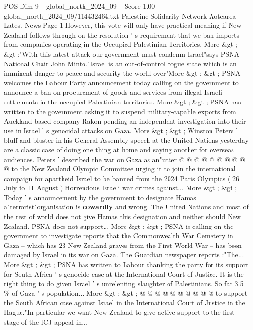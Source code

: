 \begin{textsample}{POS Dim 9 – global\_north\_2024\_09 – Score 1.00 – global\_north\_2024\_09/114432464.txt}  \label{ex:f9_pos_250}
Palestine Solidarity Network Aotearoa - Latest News Page 1 However, this vote will only have practical meaning if New Zealand follows through on the resolution ' s requirement that we ban imports from companies operating in the Occupied Palestinian Territories.
More \&gt ; \&gt ;"With this latest attack our government must condemn Israel"says PSNA National Chair John Minto."Israel is an out-of-control rogue state which is an imminent danger to peace and security the world over"More \&gt ; \&gt ; PSNA welcomes the Labour Party announcement today calling on the government to announce a ban on procurement of goods and services from illegal Israeli settlements in the occupied Palestinian territories.
More \&gt ; \&gt ; PSNA has written to the government asking it to suspend military-capable exports from Auckland-based company Rakon pending an independent investigation into their use in Israel ' s genocidal attacks on Gaza.
More \&gt ; \&gt ; Winston Peters ' bluff and bluster in his General Assembly speech at the United Nations yesterday are a classic case of doing one thing at home and saying another for overseas audiences.
Peters ' described the war on Gaza as an"utter @ @ @ @ @ @ @ @ @ @ to the New Zealand Olympic Committee urging it to join the international campaign for apartheid Israel to be banned from the 2024 Paris Olympics ( 26 July to 11 August ) Horrendous Israeli war crimes against...
More \&gt ; \&gt ; Today ' s announcement by the government to designate Hamas a"terrorist"organisation is \textbf{cowardly} and wrong.
The United Nations and most of the rest of world does not give Hamas this designation and neither should New Zealand.
PSNA does not support...
More \&gt ; \&gt ; PSNA is calling on the government to investigate reports that the Commonwealth War Cemetery in Gaza -- which has 23 New Zealand graves from the First World War -- has been damaged by Israel in its war on Gaza.
The Guardian newspaper reports :"The...
More \&gt ; \&gt ; PSNA has written to Labour thanking the party for its support for South Africa ' s genocide case at the International Court of Justice.
It is the right thing to do given Israel ' s unrelenting slaughter of Palestinians.
So far 3.5 \% of Gaza ' s population...
More \&gt ; \&gt ; @ @ @ @ @ @ @ @ @ @ to support the South African case against Israel in the International Court of Justice in the Hague."In particular we want New Zealand to give active support to the first stage of the ICJ appeal in...

\end{textsample}
